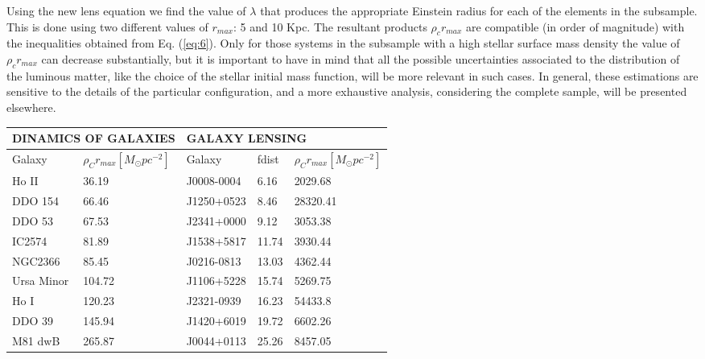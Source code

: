 \documentclass[10pt, letterpaper]{article}
\begin{document}
\begin{multicols}{2}
		Using the new lens equation we find the value of $\lambda$ that produces the appropriate Einstein radius for each of the elements in the subsample. This is done using two different values of $r_{max}$: 5 and 10 Kpc. The resultant products $\rho_c r_{max}$ are compatible (in order of magnitude) with the inequalities obtained from Eq. (\ref{eq:6}). Only for those systems in the subsample with a high stellar surface mass density the value of $\rho_c r_{max}$ can decrease substantially, but it is important to have in mind that all the possible uncertainties associated to the distribution of the luminous matter, like the choice of the stellar initial mass function, will be more relevant in such cases. In general, these estimations are sensitive to the details of the particular configuration, and a more exhaustive analysis, considering the complete sample, will be presented elsewhere.
	\end{multicols} 
		\newpage
		\begin{table}[h!]
			\centering
			\label{tabla}
			\begin{tabular}{|l|l|l|l|l|} 
				\hline
				\multicolumn{2}{|l|}{DINAMICS OF GALAXIES} & \multicolumn{3}{l|}{GALAXY LENSING}  \\ 
				\hline
				Galaxy     & \(\rho_{C}r_{max}[M_{\odot}pc^{-2}]\)                          & Galaxy     & fdist & \(\rho_{C}r_{max}[M_{\odot}pc^{-2}]\)              \\ 
				\hline
				Ho II      & 36.19                         & J0008-0004 & 6.16  & 2029.68         \\ 
				\hline
				DDO 154    & 66.46                         & J1250+0523 & 8.46  & 28320.41        \\ 
				\hline
				DDO 53     & 67.53                         & J2341+0000 & 9.12  & 3053.38         \\ 
				\hline
				IC2574     & 81.89                         & J1538+5817 & 11.74 & 3930.44         \\ 
				\hline
				NGC2366    & 85.45                         & J0216-0813 & 13.03 & 4362.44         \\ 
				\hline
				Ursa Minor & 104.72                        & J1106+5228 & 15.74 & 5269.75         \\ 
				\hline
				Ho I       & 120.23                        & J2321-0939 & 16.23 & 54433.8         \\ 
				\hline
				DDO 39     & 145.94                        & J1420+6019 & 19.72 & 6602.26         \\ 
				\hline
				M81 dwB    & 265.87                        & J0044+0113 & 25.26 & 8457.05         \\
				\hline
			\end{tabular}
		\end{table}
\end{document}
